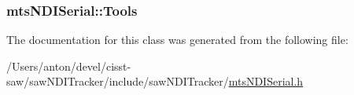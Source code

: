 \subsubsection[{Tools}]{ mts\+N\+D\+I\+Serial\+::\+Tools\hspace{0.3cm}{\ttfamily [protected]}}\label{classmts_n_d_i_serial_adae8811079b92709d39a1818eba867c1}


The documentation for this class was generated from the following file\+:\begin{DoxyCompactItemize}
\item 
/\+Users/anton/devel/cisst-\/saw/saw\+N\+D\+I\+Tracker/include/saw\+N\+D\+I\+Tracker/\hyperlink{mts_n_d_i_serial_8h}{mts\+N\+D\+I\+Serial.\+h}\end{DoxyCompactItemize}
